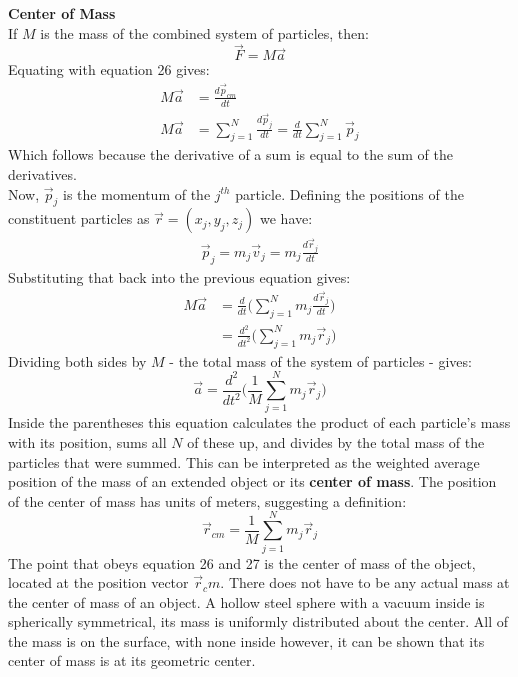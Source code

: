 \documentclass[a4paper]{article}
\let\bf\textbf
\begin{document}
\newpage
\noindent\bf{Center of Mass}
\vspace{2mm}\\
If $M$ is the mass of the combined system of particles, then:
\begin{equation}
    \vec{F} = M\vec{a}
\end{equation}
Equating with equation 26 gives:
\begin{align*}
    M\vec{a} &= \frac{d\vec{p}_{cm}}{dt}\\
    M\vec{a} &= \sum_{j = 1}^{N}\frac{d\vec{p}_j}{dt} = \frac{d}{dt}\sum_{j = 1}^{N}\vec{p}_j
\end{align*}
Which follows because the derivative of a sum is equal to the sum of the derivatives.
\vspace{1mm}\\
Now, $\vec{p}_j$ is the momentum of the $j^{th}$ particle. Defining the positions of the constituent particles as $\vec{r} = (x_j, y_j, z_j)$ we have:
\begin{align*}
    \vec{p}_j = m_j\vec{v}_j = m_j\frac{d\vec{r}_j}{dt}
\end{align*}
Substituting that back into the previous equation gives:
\begin{align*}
    M\vec{a} &= \frac{d}{dt}\bigg(\sum_{j = 1}^{N}m_j\frac{d\vec{r}_j}{dt}\bigg)\\
    &= \frac{d^2}{dt^2}\bigg(\sum_{j = 1}^{N}m_j\vec{r}_j\bigg)
\end{align*}
Dividing both sides by $M$ - the total mass of the system of particles - gives:
\begin{equation}
    \vec{a} = \frac{d^2}{dt^2}\bigg(\frac{1}{M}\sum_{j = 1}^{N}m_j\vec{r}_j\bigg)
\end{equation}
Inside the parentheses this equation calculates the product of each particle's mass with its position, sums all $N$ of these up, and divides by the total mass of the particles that were summed. This can be interpreted as the weighted average position of the mass of an extended object or its \bf{center of mass}. The position of the center of mass has units of meters, suggesting a definition:
\begin{equation}
    \vec{r}_{cm} = \frac{1}{M}\sum_{j = 1}^{N}m_j\vec{r}_j
\end{equation}
The point that obeys equation 26 and 27 is the center of mass of the object, located at the position vector $\vec{r}_cm$. There does not have to be any actual mass at the center of mass of an object. A hollow steel sphere with a vacuum inside is spherically symmetrical, its mass is uniformly distributed about the center. All of the mass is on the surface, with none inside however, it can be shown that its center of mass is at its geometric center.
\end{document}
